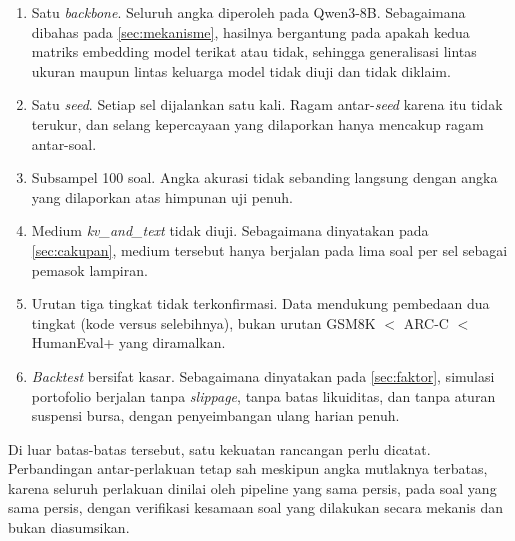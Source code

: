 \begin{enumerate}
    \item Satu \textit{backbone}. Seluruh angka diperoleh pada
          Qwen3-8B. Sebagaimana dibahas pada \ref{sec:mekanisme}, hasilnya
          bergantung pada apakah kedua matriks embedding model terikat atau
          tidak, sehingga generalisasi lintas ukuran maupun lintas keluarga
          model tidak diuji dan tidak diklaim.
    \item Satu \textit{seed}. Setiap sel dijalankan satu kali. Ragam
          antar-\textit{seed} karena itu tidak terukur, dan selang kepercayaan
          yang dilaporkan hanya mencakup ragam antar-soal.
    \item Subsampel 100 soal. Angka akurasi tidak sebanding langsung
          dengan angka yang dilaporkan atas himpunan uji penuh.
    \item Medium \textit{kv\_and\_text} tidak diuji. Sebagaimana
          dinyatakan pada \ref{sec:cakupan}, medium tersebut hanya berjalan
          pada lima soal per sel sebagai pemasok lampiran.
    \item Urutan tiga tingkat tidak terkonfirmasi. Data mendukung
          pembedaan dua tingkat (kode versus selebihnya), bukan urutan
          GSM8K $<$ ARC-C $<$ HumanEval+ yang diramalkan.
    \item \textit{Backtest} bersifat kasar. Sebagaimana dinyatakan
          pada \ref{sec:faktor}, simulasi portofolio berjalan tanpa
          \textit{slippage}, tanpa batas likuiditas, dan tanpa aturan suspensi
          bursa, dengan penyeimbangan ulang harian penuh.
\end{enumerate}

Di luar batas-batas tersebut, satu kekuatan rancangan perlu dicatat.
Perbandingan antar-perlakuan tetap sah meskipun angka mutlaknya terbatas,
karena seluruh perlakuan dinilai oleh pipeline yang sama persis, pada soal yang
sama persis, dengan verifikasi kesamaan soal yang dilakukan secara mekanis dan
bukan diasumsikan.
